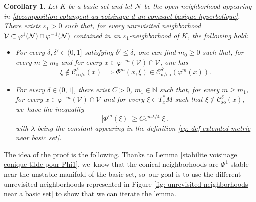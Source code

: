 \documentclass[JEP,XML,SOM,Unicode,NoEqCountersInSection,NoFloatCountersInSection,published]{cedram}
\newcommand{\rs}{\mathrm{s}}
\newcommand{\rso}{\mathrm{so}}
\newcommand{\ru}{\mathrm{u}}
\newcommand{\ruo}{\mathrm{uo}}
\theoremstyle{definition}
\theoremstyle{plain}
\newtheorem{corollary}[definition]{Corollary}
\newcommand{\Ccal}{\mathcal{C}}
\newcommand{\Ncal}{\mathcal{N}}
\newcommand{\N}{\mathbb{N}}
\newcommand{\Vcal}{\mathcal{V}}
\begin{document}
\begin{corollary}\label{corollary big lemma} Let $K$ be a basic set and let $\Ncal$ be the open neighborhood appearing in \eqref{decomposition cotangent au voisinage d un compact basique hyperbolique}. There exists $\varepsilon_1 >0$ such that, for every unrevisited neighborhood $\Vcal\subset \varphi^1(\Ncal) \cap\nobreak\varphi^{-1}(\Ncal)$ contained in an $\varepsilon_1$-neighborhood of $K$, the following hold:
\begin{itemize}
\item For every $\delta,\delta'\in(0,1]$ satisfying $\delta' \leq \delta$, one can find $m_{0}\geq 0$ such that, for every $m \geq m_{0}$ and for every $x \in \varphi^{-m}(\Vcal)\cap \Vcal$, one has
\[
\xi \notin \Ccal_{\rso/\rs}^{\delta} (x) \implies \Phi^{ m} (x,\xi) \in \Ccal_{\ru/\ruo}^{\delta'} (\varphi^{m} (x)).
\]
\item For every $\delta\in(0,1]$, there exist $C > 0$, $m_1 \in \N$ such that, for every $m \geq m_1$, for every $x \in \varphi^{-m}(\Vcal)\cap \Vcal$ and for every $\xi \in T_x^* M$ such that $ \xi \notin \Ccal_{\rso}^{\delta} (x) $, we~have the inequality
\begin{equation}\label{eq: corollary big lemma - statement exponential estimates}
|\Phi^{ m} (\xi)| \geq C e^{m \lambda /4} |\xi|,
\end{equation}
with $\lambda$ being the constant appearing in the definition \eqref{eq: def extended metric near basic set}.
\end{itemize}
\end{corollary}

The idea of the proof is the following. Thanks to Lemma \ref{stabilite voisinage conique tilde pour Phi1}, we~know that the conical neighborhoods are $\Phi^1$-stable near the unstable manifold of the basic set, so~our goal is to use the different unrevisited neighborhoods represented in Figure \ref{fig: unrevisited neighborhoods near a basic set} to show that we can iterate the lemma.
\end{document}
